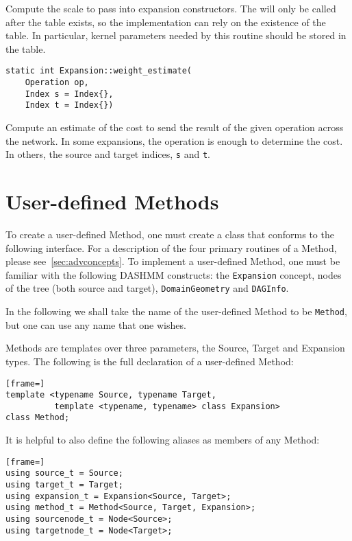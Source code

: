 \noindent Compute the scale to pass into expansion constructors. The will only
be called
after the table exists, so the implementation can rely on the existence of the
table. In particular, kernel parameters needed by this routine should be
stored in the table.

\begin{lstlisting}
static int Expansion::weight_estimate(
    Operation op,
    Index s = Index{},
    Index t = Index{})
\end{lstlisting}

\noindent Compute an estimate of the cost to send the result of the given
operation
across the network. In some expansions, the operation is enough to determine
the cost. In others, the source and target indices, \texttt{s} and \texttt{t}.



\section{User-defined Methods}

To create a user-defined Method, one must create a class that conforms
to the following interface. For a description of the four primary routines
of a Method, please see~\ref{sec:advconcepts}. To implement a user-defined
Method, one must be familiar with the following DASHMM constructs: the
\texttt{Expansion} concept, nodes of the tree (both source and target),
\texttt{DomainGeometry} and \texttt{DAGInfo}.

In the following we shall take the name of the user-defined Method to be
\texttt{Method}, but one can use any name that one wishes.

Methods are templates over three parameters, the Source, Target and Expansion
types. The following is the full declaration of a user-defined Method:

\begin{lstlisting}[frame=]
template <typename Source, typename Target,
          template <typename, typename> class Expansion>
class Method;
\end{lstlisting}

\noindent It is helpful to also define the following aliases as members of
any Method:

\begin{lstlisting}[frame=]
using source_t = Source;
using target_t = Target;
using expansion_t = Expansion<Source, Target>;
using method_t = Method<Source, Target, Expansion>;
using sourcenode_t = Node<Source>;
using targetnode_t = Node<Target>;
\end{lstlisting}

